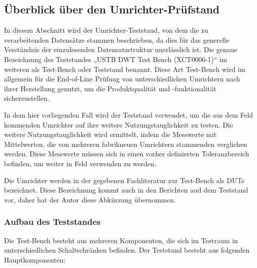 
\subsection{Überblick über den Umrichter-Prüfstand}
\label{subsec:uberblick-uber-den-umrichter-prufstand}

In diesem Abschnitt wird der Umrichter-Teststand, von dem die zu verarbeitenden Datensätze stammen beschrieben,
da dies für das generelle Verständnis der einzulesenden Datensatzstruktur unerlässlich ist.
Die genaue Bezeichnung des Teststandes „USTB DWT Test Bench (XCT0006-1)“ im weiteren als Test-Bench oder Teststand benannt.
Diese Art Test-Bench wird im allgemein für die End-of-Line Prüfung von unterschiedlichen Umrichtern nach ihrer Herstellung genutzt,
um die Produktqualität und -funktionalität sicherzustellen.\cite*{Main_Manuel_USTB2018}

In dem hier vorliegenden Fall wird der Teststand verwendet, um die aus dem Feld kommenden Umrichter auf ihre weitere Nutzungstauglichkeit zu testen.
Die weitere Nutzungstauglichkeit wird ermittelt, indem die Messwerte mit Mittelwerten, die von mehreren fabrikneuen Umrichtern stammenden verglichen werden.
Diese Messwerte müssen sich in einen vorher definierten Toleranzbereich befinden, um weiter in Feld verwenden zu werden.

Die Umrichter werden in der gegebenen Fachliteratur zur Test-Bench als \ac{DUTs} bezeichnet.
Diese Bezeichnung kommt auch in den Berichten aud dem Teststand vor, daher hat der Autor diese Abkürzung übernommen.
\subsubsection{Aufbau des Teststandes}
Die Test-Bench besteht aus mehreren Komponenten, die sich im Testraum in unterschiedlichen Schaltschränken befinden.
Der Teststand besteht aus folgenden Hauptkomponenten:

